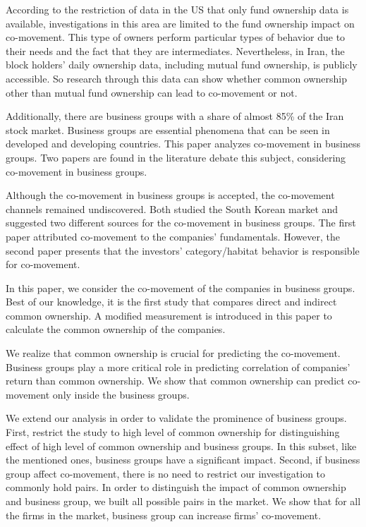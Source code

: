 \begin{LTR}
	According to the restriction of data in the US that only fund ownership data is available, investigations in this area are limited to the fund ownership impact on co-movement. This type of owners perform particular types of behavior due to their needs and the fact that they are intermediates.
	Nevertheless, in Iran, the block holders' daily ownership data, including mutual fund ownership, is publicly accessible. So research through this data can show whether common ownership other than mutual fund ownership can lead to co-movement or not.
	
	Additionally, there are business groups with a share of almost 85\% of the Iran stock market. Business groups are essential phenomena that can be seen in developed and developing countries. 
	This paper analyzes co-movement in business groups. Two papers are found in the literature debate this subject, considering co-movement in business groups.
	
	Although the co-movement in business groups is accepted, the co-movement channels remained undiscovered.
	Both  studied the South Korean market and suggested two different sources for the co-movement in business groups. The first paper attributed co-movement to the companies' fundamentals. However, the second paper presents that the investors' category/habitat behavior is responsible for co-movement.
	
	In this paper, we consider the co-movement of the companies in business groups. Best of our knowledge, it is the first study that compares direct and indirect common ownership.
	A modified measurement is introduced in this paper to calculate the common ownership of the companies. 
	
	We realize that common ownership is crucial for predicting the co-movement. Business groups play a more critical role in predicting correlation of companies' return than common ownership. We show that common ownership  can predict  co-movement only inside  the business groups.
	
	
	
	We extend our analysis in order to validate the prominence of business groups. First, restrict the study to high level of common ownership for distinguishing effect of high level of common ownership and business groups. 
	In this subset, like the mentioned ones, business groups have a significant impact.
	Second, if business group affect co-movement, there is no need to restrict our investigation to commonly hold pairs. In order to distinguish the impact of common ownership and business group, we built all possible pairs in the market.
	We show that for all the firms in the market, business group can increase firms' co-movement. 
	

\end{LTR}
